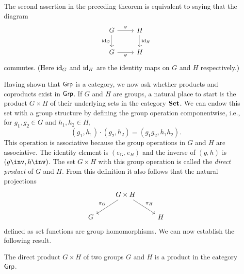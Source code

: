 The second assertion in the preceding theorem is equivalent to saying that the
diagram
\[
    \begin{tikzcd}
        G \arrow{r}{\phi} \arrow[swap]{d}{\id_G} & H \arrow{d}{\id_H} \\
        G \arrow[swap]{r}{\phi} & H
    \end{tikzcd}
\]
commutes. (Here \(\operatorname{id}_G\) and \(\operatorname{id}_H\) are the identity maps on \(G\) and \(H\)
respectively.)

Having shown that \(\mathsf{Grp}\) is a category, we now ask whether products and
coproducts exist in \(\mathsf{Grp}\). If \(G\) and \(H\) are groups, a natural place to
start is the product \(G \times H\) of their underlying sets in the category
\(\mathbf{Set}\). We can endow this set with a group structure by defining the
group operation componentwise, i.e., for \(g_1, g_2 \in G\) and \(h_1, h_2 \in
H\),
\[
    (g_1, h_1) \cdot (g_2, h_2) = (g_1g_2, h_1h_2).
\]
This operation is associative because the group operations in \(G\) and \(H\)
are associative. The identity element is \((e_G, e_H)\) and the inverse of \((g,
h)\) is \((g\inv, h\inv)\). The set \(G \times H\) with this group operation is
called the \emph{direct product} of \(G\) and \(H\). From this definition it
also follows that the natural projections
\[
        \begin{tikzcd}
            & G\times H \arrow[ld, "\pi_G"'] \arrow[rd, "\pi_H"] &   \\
          G &                                                    & H
          \end{tikzcd}
\]
defined as set functions are group homomorphisms. We can now establish the
following result.

\begin{theorem}
    The direct product \(G \times H\) of two groups \(G\) and \(H\) is a product
    in the category \(\mathsf{Grp}\).
\end{theorem}

